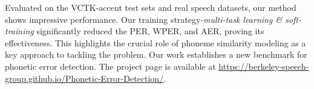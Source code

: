 Evaluated on the VCTK-accent test sets and real speech datasets, our method shows impressive performance. Our training strategy-\textit{multi-task learning \& soft-training} significantly reduced the PER, WPER, and AER, proving its effectiveness. This highlights the crucial role of phoneme similarity modeling as a key approach to tackling the problem. Our work establishes a new benchmark for phonetic error detection. The project page is available
at \url{https://berkeley-speech-group.github.io/Phonetic-Error-Detection/}.